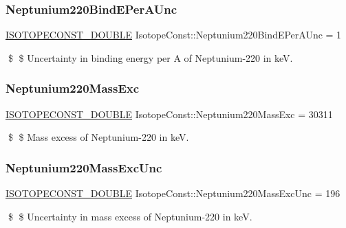 \subsubsection{\texorpdfstring{Neptunium220\+Bind\+E\+Per\+A\+Unc}{Neptunium220BindEPerAUnc}}
{\footnotesize\ttfamily \mbox{\hyperlink{group___isotope_const-_macros_ga8f45a7272ce02c0b4c65c44636ed719a}{I\+S\+O\+T\+O\+P\+E\+C\+O\+N\+S\+T\+\_\+\+D\+O\+U\+B\+LE}} Isotope\+Const\+::\+Neptunium220\+Bind\+E\+Per\+A\+Unc = 1}

\$ \$ Uncertainty in binding energy per A of Neptunium-\/220 in keV. \mbox{\label{group___isotope_const-_neptunium-_np220_ga34f5d207618de45979288824fcf8c6e3}} 
\subsubsection{\texorpdfstring{Neptunium220\+Mass\+Exc}{Neptunium220MassExc}}
{\footnotesize\ttfamily \mbox{\hyperlink{group___isotope_const-_macros_ga8f45a7272ce02c0b4c65c44636ed719a}{I\+S\+O\+T\+O\+P\+E\+C\+O\+N\+S\+T\+\_\+\+D\+O\+U\+B\+LE}} Isotope\+Const\+::\+Neptunium220\+Mass\+Exc = 30311}

\$ \$ Mass excess of Neptunium-\/220 in keV. \mbox{\label{group___isotope_const-_neptunium-_np220_gac37f8493843442af159e5672bfa319e2}} 
\subsubsection{\texorpdfstring{Neptunium220\+Mass\+Exc\+Unc}{Neptunium220MassExcUnc}}
{\footnotesize\ttfamily \mbox{\hyperlink{group___isotope_const-_macros_ga8f45a7272ce02c0b4c65c44636ed719a}{I\+S\+O\+T\+O\+P\+E\+C\+O\+N\+S\+T\+\_\+\+D\+O\+U\+B\+LE}} Isotope\+Const\+::\+Neptunium220\+Mass\+Exc\+Unc = 196}

\$ \$ Uncertainty in mass excess of Neptunium-\/220 in keV. \mbox{\label{group___isotope_const-_neptunium-_np220_ga5cf3ea318b9c134bf781492c4fed674b}} 
